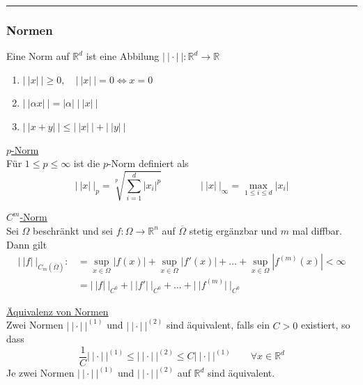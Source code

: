 \documentclass[6pt]{article}
\newcommand{\R}{\mathbb{R}}
\newcommand{\norm}[1]{| \!\:\! | #1 | \!\:\! |}
\begin{document}
\begin{multicols*}{2}
	\vspace{3mm}
  	\noindent\textcolor{gray}{\rule{14cm}{0.1pt}}
	\vspace{-4mm}

\subsubsection*{Normen}
		Eine Norm auf $\R^d$ ist eine Abbilung $\norm \cdot: \R^d \to \R$
		\begin{enumerate}
			\item $\norm x \geq 0, \quad \norm x = 0 \iff x = 0$
			\item $\norm{\alpha x} = | \alpha | \; \norm x$
			\item $\norm{ x+y } \leq \norm x + \norm y$
		\end{enumerate}
		
		\underline{$p$-Norm} \vspace{1mm}\\
		F{\"u}r $1 \leq p \leq \infty$ ist die $p$-Norm definiert als
		\[ \norm{x}_p = \sqrt[p]{\sum_{i = 1}^d |x_i| ^p} \qquad\qquad \norm{x}_\infty = \max_{1 \leq i \leq d} |x_i| \]
		
		\underline{$C^m$-Norm} \vspace{1mm}\\
		Sei $ \Omega$ beschr{\"a}nkt und sei $f: \Omega \to \R^n$ auf $ \overline{\Omega}$ stetig erg{\"a}nzbar und $m$ mal diffbar. Dann gilt
		\begin{align*}
			\norm{f}_{C_m(\overline{\Omega})} :&= \sup_{x \in \Omega} |f(x)| + \sup_{x \in \Omega} |f'(x)| + \ldots + \sup_{x \in \Omega} |f^{(m)}(x)| < \infty \\
			& = \norm{f}_{C^0} + \norm{f'}_{C^0} + \ldots + \norm{f^{(m)}}_{C^0}
		\end{align*}
		
		\underline{{\"A}quivalenz von Normen} \vspace{1mm}\\
		Zwei Normen $\norm{\cdot}^{(1)}$ und $\norm{\cdot}^{(2)}$ sind {\"a}quivalent, falls ein $C > 0$ existiert, so dass
		\[ \frac{1}{C} \norm{\cdot}^{(1)} \leq \norm{\cdot}^{(2)} \leq C \norm{\cdot}^{(1)} \qquad \forall x \in \R^d \]
		Je zwei Normen $\norm{\cdot}^{(1)}$ und $\norm{\cdot}^{(2)}$ auf $\R^d$ sind {\"a}quivalent.



\end{multicols*}
\end{document}
